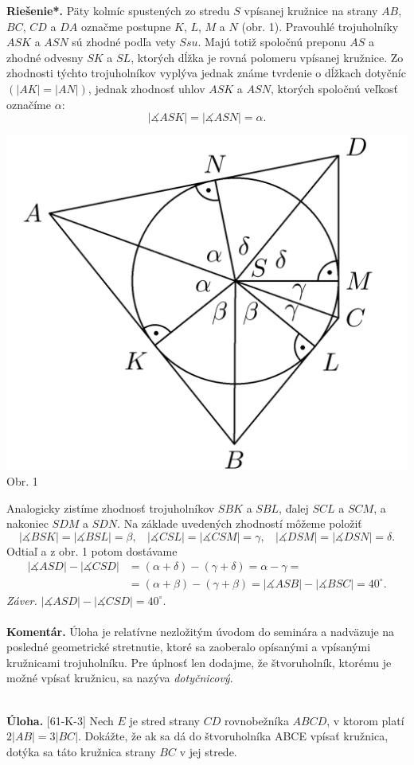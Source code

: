 \documentclass[11pt,a4paper,oneside,final]{book}
\newcommand{\kom}{\textbf{Komentár.} }
\newcommand{\ul}{\textbf{Úloha.} }
\newcommand{\rieh}{\textbf{Riešenie*.} }
\newcommand{\ma}{\measuredangle}
\begin{document}
\rieh Päty kolmíc spustených zo stredu $S$ vpísanej kružnice na strany $AB$, $BC$, $CD$ a $DA$ označme postupne $K$, $L$, $M$ a $N$ (obr. 1). Pravouhlé trojuholníky $ASK$ a $ASN$ sú zhodné podľa vety $Ssu$. Majú totiž spoločnú preponu $AS$ a zhodné odvesny $SK$ a $SL$, ktorých dĺžka je rovná polomeru vpísanej kružnice. Zo zhodnosti týchto trojuholníkov vyplýva jednak známe tvrdenie o dĺžkach dotyčníc $(|AK| = |AN|)$, jednak zhodnosť uhlov $ASK$ a $ASN$, ktorých spoločnú veľkosť označíme $\alpha$:$$|\ma ASK| = |\ma ASN| = \alpha.$$
\begin{center}
\includegraphics[scale=0.3]{57D2}\\

Obr. 1
\end{center}
Analogicky zistíme zhodnosť trojuholníkov $SBK$ a $SBL$, ďalej $SCL$ a $SCM$, a nakoniec $SDM$ a $SDN$. Na základe uvedených zhodností môžeme položiť
$$|\ma BSK| = |\ma BSL| = \beta, \ \ \ \  |\ma CSL| = |\ma CSM| = \gamma, \ \ \ \  |\ma DSM| = |\ma DSN| = \delta.$$
Odtiaľ a z obr. 1 potom dostávame
\begin{align*}
|\ma ASD| - |\ma CSD| &= (\alpha + \delta)- (\gamma + \delta) = \alpha - \gamma =\\
&= (\alpha + \beta) - (\gamma + \beta) = |\ma ASB| - |\ma BSC| = 40^\circ.
\end{align*}
\textit{Záver.} $|\ma ASD|  -|\ma CSD| = 40^\circ$.\\
\\
\kom Úloha je relatívne nezložitým úvodom do seminára a nadväzuje na posledné geometrické stretnutie, ktoré sa zaoberalo opísanými a vpísanými kružnicami trojuholníku. Pre úplnosť len dodajme, že štvoruholník, ktorému je možné vpísať kružnicu, sa nazýva \textit{dotyčnicový}.\\
\\
\begin{tcolorbox}[breakable,notitle,boxrule=0pt,colback=light-gray,colframe=light-gray]\ul [61-K-3] Nech $E$ je stred strany $CD$ rovnobežníka $ABCD$, v ktorom platí $2|AB| = 3|BC|$. Dokážte, že ak sa dá do štvoruholníka ABCE vpísať kružnica, dotýka sa táto kružnica strany $BC$ v jej strede.

\end{tcolorbox}
\end{document}
